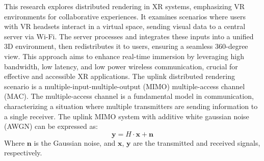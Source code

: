 
This research explores distributed rendering in XR systems, emphasizing VR environments for collaborative experiences. It examines scenarios where users with VR headsets interact in a virtual space, sending visual data to a central server via Wi-Fi. The server processes and integrates these inputs into a unified 3D environment, then redistributes it to users, ensuring a seamless 360-degree view. This approach aims to enhance real-time immersion by leveraging high bandwidth, low latency, and low power wireless communication, crucial for effective and accessible XR applications. The uplink distributed rendering scenario is a multiple-input-multiple-output (MIMO) multiple-access channel (MAC). The multiple-access channel is a fundamental model in communication, characterizing a situation where multiple transmitters are sending information to a single receiver\cite{book}. The uplink MIMO system with additive white gaussian noise (AWGN) can be expressed as:
\begin{equation}
    \boldsymbol{y} = H\cdot \boldsymbol{x} + \boldsymbol{n}
\end{equation}
Where $\boldsymbol{n}$ is the Gaussian noise, and $\boldsymbol{x}$, $\boldsymbol{y}$ are the transmitted and received signals, respectively. 

